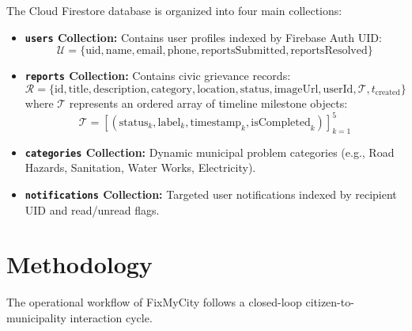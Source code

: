 \documentclass[conference]{IEEEtran}
\begin{document}
The Cloud Firestore database is organized into four main collections:
\begin{itemize}
    \item \textbf{\texttt{users} Collection:} Contains user profiles indexed by Firebase Auth UID:
    \begin{equation}
        \mathcal{U} = \{\text{uid}, \text{name}, \text{email}, \text{phone}, \text{reportsSubmitted}, \text{reportsResolved}\}
    \end{equation}
    \item \textbf{\texttt{reports} Collection:} Contains civic grievance records:
    \begin{equation}
        \mathcal{R} = \{\text{id}, \text{title}, \text{description}, \text{category}, \text{location}, \text{status}, \text{imageUrl}, \text{userId}, \mathcal{T}, t_{\text{created}}\}
    \end{equation}
    where $\mathcal{T}$ represents an ordered array of timeline milestone objects:
    \begin{equation}
        \mathcal{T} = [(\text{status}_k, \text{label}_k, \text{timestamp}_k, \text{isCompleted}_k)]_{k=1}^5
    \end{equation}
    \item \textbf{\texttt{categories} Collection:} Dynamic municipal problem categories (e.g., Road Hazards, Sanitation, Water Works, Electricity).
    \item \textbf{\texttt{notifications} Collection:} Targeted user notifications indexed by recipient UID and read/unread flags.
\end{itemize}

\section{Methodology}

The operational workflow of FixMyCity follows a closed-loop citizen-to-municipality interaction cycle.
\end{document}
